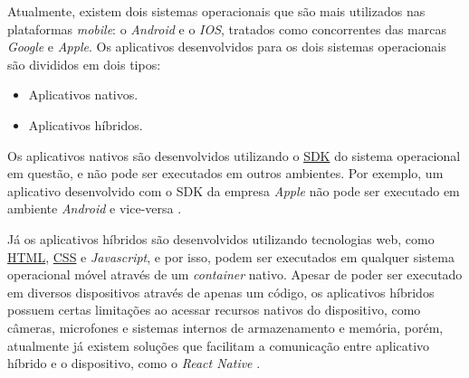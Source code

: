 Atualmente, existem dois sistemas operacionais que são mais utilizados nas plataformas \textit{mobile}: o \textit{Android} e o \textit{IOS}, tratados como concorrentes das marcas \textit{Google} e \textit{Apple}. Os aplicativos desenvolvidos para os dois sistemas operacionais são divididos em dois tipos:
\begin{itemize}
\item Aplicativos nativos.
\item Aplicativos híbridos.
\end{itemize}

Os aplicativos nativos são desenvolvidos utilizando o \label{sig:SDK}\hyperlink{s:SDK}{SDK} do sistema operacional em questão, e não pode ser executados em outros ambientes. Por exemplo, um aplicativo desenvolvido com o SDK da empresa \textit{Apple} não pode ser executado em ambiente \textit{Android} e vice-versa \cite{MobileApps}.

Já os aplicativos híbridos são desenvolvidos utilizando tecnologias web, como \label{sig:HTML}\hyperlink{s:HTML}{HTML}, \label{sig:CSS}\hyperlink{s:CSS}{CSS} e \textit{Javascript}, e por isso, podem ser executados em qualquer sistema operacional móvel através de um \textit{container} nativo. Apesar de poder ser executado em diversos dispositivos através de apenas um código, os aplicativos híbridos	 possuem certas limitações ao acessar recursos nativos do dispositivo, como câmeras, microfones e sistemas internos de armazenamento e memória, porém, atualmente já existem soluções que facilitam a comunicação entre aplicativo híbrido e o dispositivo, como o \textit{React Native} \cite{MobileApps}.





